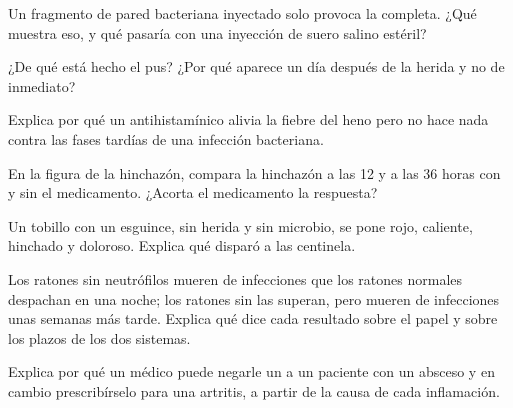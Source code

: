 \begin{exercise}[$\star\star$]\label{exo:g12:innate-immunity:7}
Un fragmento de pared bacteriana inyectado solo provoca la  completa. ¿Qué muestra eso, y qué pasaría con una
inyección de suero salino estéril?
\end{exercise}

\begin{exercise}[$\star\star$]\label{exo:g12:innate-immunity:8}
¿De qué está hecho el pus? ¿Por qué aparece un día después de la herida
y no de inmediato?
\end{exercise}

\begin{exercise}[$\star\star$]\label{exo:g12:innate-immunity:9}
Explica por qué un antihistamínico alivia la fiebre del heno pero no
hace nada contra las fases tardías de una infección bacteriana.
\end{exercise}

\begin{exercise}[$\star\star$]\label{exo:g12:innate-immunity:10}
En la figura de la hinchazón, compara la hinchazón a las 12 y a las 36
horas con y sin el medicamento. ¿Acorta el medicamento la respuesta?
\end{exercise}

\begin{exercise}[$\star\star$]\label{exo:g12:innate-immunity:11}
Un tobillo con un esguince, sin herida y sin microbio, se pone rojo,
caliente, hinchado y doloroso. Explica qué disparó a las 
centinela.
\end{exercise}

\begin{exercise}[$\star\star\star$]\label{exo:g12:innate-immunity:12}
Los ratones sin neutrófilos mueren de infecciones que los ratones
normales despachan en una noche; los ratones sin 
las superan, pero mueren de infecciones unas semanas más tarde. Explica
qué dice cada resultado sobre el papel y sobre los plazos de los dos
sistemas.
\end{exercise}

\begin{exercise}[$\star\star\star$]\label{exo:g12:innate-immunity:13}
Explica por qué un médico puede negarle un  a un
paciente con un absceso y en cambio prescribírselo para una artritis, a
partir de la causa de cada inflamación.
\end{exercise}

